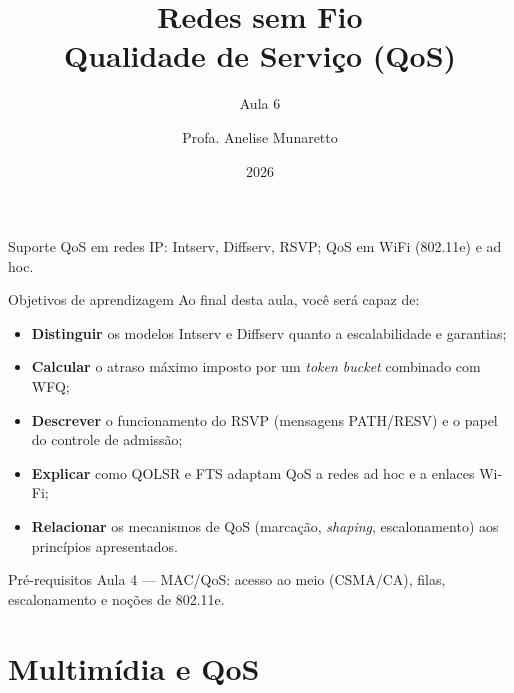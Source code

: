 \documentclass[aspectratio=169,11pt]{beamer}
\title[Redes sem Fio]{Redes sem Fio\\ Qualidade de Serviço (QoS)}
\subtitle{Aula 6}
\author[Anelise Munaretto]{Profa. Anelise Munaretto}
\institute[Curso]{Redes sem Fio --- Ciência da Computação}
\date{2026}
\begin{document}
\begin{frame}[plain]
  \titlepage
  \begin{center}
    \scriptsize Suporte QoS em redes IP: Intserv, Diffserv, RSVP; QoS em WiFi (802.11e) e ad hoc.
  \end{center}
\end{frame}

\begin{frame}{Objetivos de aprendizagem}
  Ao final desta aula, você será capaz de:
  \begin{itemize}
    \item \textbf{Distinguir} os modelos Intserv e Diffserv quanto a escalabilidade e garantias;
    \item \textbf{Calcular} o atraso máximo imposto por um \emph{token bucket} combinado com WFQ;
    \item \textbf{Descrever} o funcionamento do RSVP (mensagens PATH/RESV) e o papel do controle de admissão;
    \item \textbf{Explicar} como QOLSR e FTS adaptam QoS a redes ad hoc e a enlaces Wi-Fi;
    \item \textbf{Relacionar} os mecanismos de QoS (marcação, \emph{shaping}, escalonamento) aos princípios apresentados.
  \end{itemize}
  \begin{alertblock}{Pré-requisitos}
    Aula 4 --- MAC/QoS: acesso ao meio (CSMA/CA), filas, escalonamento e noções de 802.11e.
  \end{alertblock}
\end{frame}

\section{Multimídia e QoS}
\end{document}
